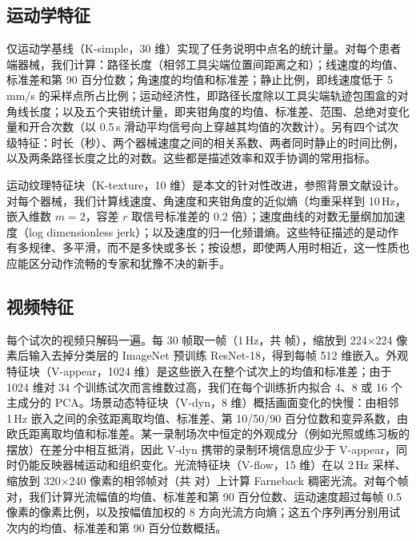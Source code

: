 \subsection{运动学特征}

仅运动学基线（K-simple，30 维）实现了任务说明中点名的统计量。对每个患者端器械，我们计算：路径长度（相邻工具尖端位置间距离之和）；线速度的均值、标准差和第 90 百分位数；角速度的均值和标准差；静止比例，即线速度低于 5\,mm/s 的采样点所占比例；运动经济性，即路径长度除以工具尖端轨迹包围盒的对角线长度；以及五个夹钳统计量，即夹钳角度的均值、标准差、范围、总绝对变化量和开合次数（以 0.5\,s 滑动平均信号向上穿越其均值的次数计）。另有四个试次级特征：时长（秒）、两个器械速度之间的相关系数、两者同时静止的时间比例，以及两条路径长度之比的对数。这些都是描述效率和双手协调的常用指标\citep{reiley2011review, lefor2020motion}。

运动纹理特征块（K-texture，10 维）是本文的针对性改进，参照背景文献\citep{zia2018rmis}设计。对每个器械，我们计算线速度、角速度和夹钳角度的近似熵\citep{pincus1991apen}（均重采样到 10\,Hz，嵌入维数 $m = 2$，容差 $r$ 取信号标准差的 0.2 倍）；速度曲线的对数无量纲加加速度（log dimensionless jerk）\citep{hogan2009smoothness}；以及速度的归一化频谱熵。这些特征描述的是动作有多规律、多平滑，而不是多快或多长；按设想，即使两人用时相近，这一性质也应能区分动作流畅的专家和犹豫不决的新手。

\subsection{视频特征}

每个试次的视频只解码一遍。每 30 帧取一帧（1\,Hz，共 \NFramesOneHz{} 帧），缩放到 224$\times$224 像素后输入去掉分类层的 ImageNet 预训练 ResNet-18\citep{he2016resnet}，得到每帧 512 维嵌入。外观特征块（V-appear，1024 维）是这些嵌入在整个试次上的均值和标准差；由于 1024 维对 34 个训练试次而言维数过高，我们在每个训练折内拟合 4、8 或 16 个主成分的 PCA。场景动态特征块（V-dyn，8 维）概括画面变化的快慢：由相邻 1\,Hz 嵌入之间的余弦距离取均值、标准差、第 10/50/90 百分位数和变异系数，由欧氏距离取均值和标准差。某一录制场次中恒定的外观成分（例如光照或练习板的摆放）在差分中相互抵消，因此 V-dyn 携带的录制环境信息应少于 V-appear，同时仍能反映器械运动和组织变化。光流特征块（V-flow，15 维）在以 2\,Hz 采样、缩放到 320$\times$240 像素的相邻帧对（共 \NPairsTwoHz{} 对）上计算 Farneback 稠密光流\citep{farneback2003flow}。对每个帧对，我们计算光流幅值的均值、标准差和第 90 百分位数、运动速度超过每帧 0.5 像素的像素比例，以及按幅值加权的 8 方向光流方向熵；这五个序列再分别用试次内的均值、标准差和第 90 百分位数概括。

